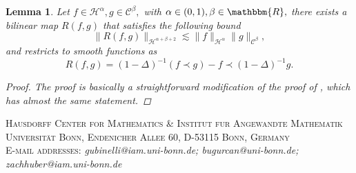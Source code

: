 \documentclass[11pt, oneside]{article}   	%
\makeatletter
\newtheorem{lemma}[theorem]{Lemma}
\newcommand{\CC}{\mathscr{C}}
\newcommand{\ssp}{\mathscr{H}}
\newcommand{\Addresses}{{%
		\bigskip
		\footnotesize
		
	 \textsc{ Hausdorff Center for Mathematics \& Institut fur Angewandte 
	 	Mathematik\\ Universit\"at Bonn, Endenicher Allee 60, D-53115 Bonn, Germany \\
	 	E-mail addresses: }
		\textit{gubinelli@iam.uni-bonn.de; bugurcan@uni-bonn.de; zachhuber@iam.uni-bonn.de} }}
\makeatother
\begin{document}
	\begin{lemma}
		\label{lem:comm2}Let $f \in \ssp^{\alpha}, g \in \CC^{\beta},$ with
		$\alpha \in (0, 1), \beta \in \mathbbm{R},$  there exists a bilinear map $R (f, g)$ that satisfies the following bound
		\[ \| R (f, g) \|_{\ssp^{\alpha + \beta + 2}} \lesssim \| f
		\|_{\ssp^{\alpha}} \| g \|_{\CC^{\beta}}, \]
		and restricts to smooth functions as
		\[ R (f, g) = (1 - \Delta)^{- 1} (f \prec g) - f \prec (1 -
		\Delta)^{- 1} g. \]
		
		
		
		\begin{proof}
			The proof is basically a straightforward modification of the proof of {\cite[Proposition A.2]{allez_continuous_2015}}, which has almost the same statement.
		\end{proof}
	\end{lemma}
	

	





{}
	
	


\Addresses
\end{document}
